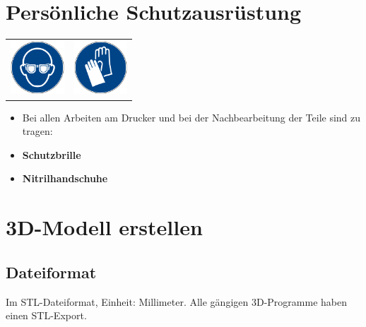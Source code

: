\documentclass{\basedir/fablab-document}
\begin{document}

\section{Persönliche Schutzausrüstung}


\begin{table}[h]
	\centering
	\begin{tabular}{cc}
		
	 \includegraphics[width=2cm]{bilder/gaugenschutz.png}  & \includegraphics[width=2cm]{bilder/ghandschuh.png} \\
	\end{tabular}
\end{table}

\begin{itemize}
	\item Bei allen Arbeiten am Drucker und bei der Nachbearbeitung der Teile sind zu tragen:
	\item \textbf{Schutzbrille} 
	\item \textbf{Nitrilhandschuhe} \\
\end{itemize}
	\newpage

	
	\renewcommand{\contentsname}{Inhaltsverzeichnis / Arbeitsablauf}
	\setcounter{tocdepth}{2}
	\tableofcontents
	\newpage
	
	\section{3D-Modell erstellen}
	
	\subsection{Dateiformat}
	
	Im STL-Dateiformat, Einheit: Millimeter. Alle gängigen 3D-Programme haben einen STL-Export.
	
\end{document}
